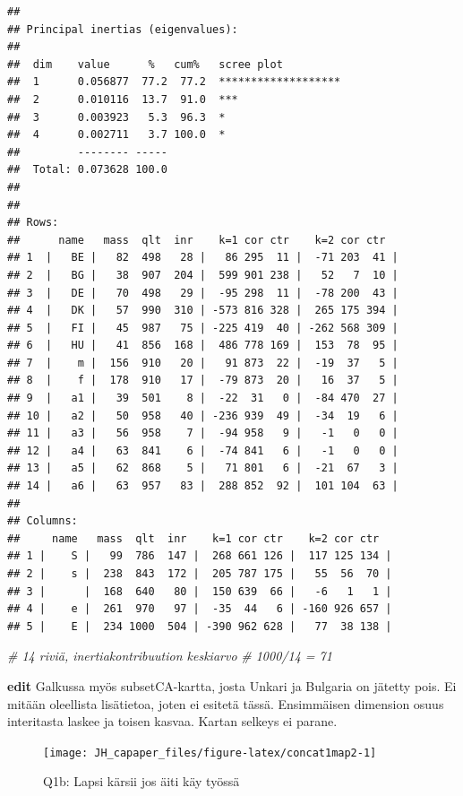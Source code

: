\documentclass[
  finnish,
]{book}
\newenvironment{Shaded}{\begin{snugshade}}{\end{snugshade}}
\newcommand{\CommentTok}[1]{\textcolor[rgb]{0.56,0.35,0.01}{\textit{#1}}}
\begin{document}
\begin{verbatim}
## 
## Principal inertias (eigenvalues):
## 
##  dim    value      %   cum%   scree plot               
##  1      0.056877  77.2  77.2  *******************      
##  2      0.010116  13.7  91.0  ***                      
##  3      0.003923   5.3  96.3  *                        
##  4      0.002711   3.7 100.0  *                        
##         -------- -----                                 
##  Total: 0.073628 100.0                                 
## 
## 
## Rows:
##      name   mass  qlt  inr    k=1 cor ctr    k=2 cor ctr  
## 1  |   BE |   82  498   28 |   86 295  11 |  -71 203  41 |
## 2  |   BG |   38  907  204 |  599 901 238 |   52   7  10 |
## 3  |   DE |   70  498   29 |  -95 298  11 |  -78 200  43 |
## 4  |   DK |   57  990  310 | -573 816 328 |  265 175 394 |
## 5  |   FI |   45  987   75 | -225 419  40 | -262 568 309 |
## 6  |   HU |   41  856  168 |  486 778 169 |  153  78  95 |
## 7  |    m |  156  910   20 |   91 873  22 |  -19  37   5 |
## 8  |    f |  178  910   17 |  -79 873  20 |   16  37   5 |
## 9  |   a1 |   39  501    8 |  -22  31   0 |  -84 470  27 |
## 10 |   a2 |   50  958   40 | -236 939  49 |  -34  19   6 |
## 11 |   a3 |   56  958    7 |  -94 958   9 |   -1   0   0 |
## 12 |   a4 |   63  841    6 |  -74 841   6 |   -1   0   0 |
## 13 |   a5 |   62  868    5 |   71 801   6 |  -21  67   3 |
## 14 |   a6 |   63  957   83 |  288 852  92 |  101 104  63 |
## 
## Columns:
##     name   mass  qlt  inr    k=1 cor ctr    k=2 cor ctr  
## 1 |    S |   99  786  147 |  268 661 126 |  117 125 134 |
## 2 |    s |  238  843  172 |  205 787 175 |   55  56  70 |
## 3 |      |  168  640   80 |  150 639  66 |   -6   1   1 |
## 4 |    e |  261  970   97 |  -35  44   6 | -160 926 657 |
## 5 |    E |  234 1000  504 | -390 962 628 |   77  38 138 |
\end{verbatim}

\begin{Shaded}
\begin{Highlighting}[]
\CommentTok{# 14 riviä, inertiakontribuution keskiarvo}
\CommentTok{# 1000/14 = 71 }
\end{Highlighting}
\end{Shaded}

\textbf{edit} Galkussa myös subsetCA-kartta, josta Unkari ja Bulgaria on jätetty pois.
Ei mitään oleellista lisätietoa, joten ei esitetä tässä. Ensimmäisen dimension
osuus interitasta laskee ja toisen kasvaa. Kartan selkeys ei parane.

\begin{figure}

{\centering \texttt{[image: JH\_capaper\_files/figure-latex/concat1map2-1]} 

}

\caption{Q1b: Lapsi kärsii jos äiti käy työssä}\label{fig:concat1map2}
\end{figure}
\end{document}
